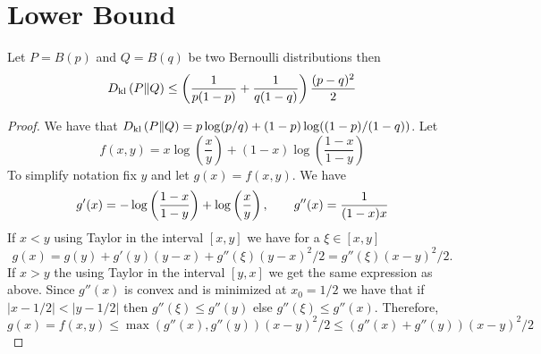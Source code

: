 \section{Lower Bound}
\begin{lemma}\label{l:dkl}
  Let $P=B(p)$ and $Q=B(q)$ be two Bernoulli distributions then
  \[
    D_{\mathrm{kl}} \left(P\|Q\right) \leq
    \left(\frac{1}{p (1-p)} + \frac{1}{q (1-q)} \right) \frac{(p - q)^2}{2}
  \]

\end{lemma}
\begin{proof}
  We have that
  \(
    D_{\mathrm{kl}} \left(P\|Q\right) = p \log (p/q) + (1-p) \log((1-p)/(1-q))
  \).
  Let
  \[
    f(x,y) =
    x \log\left(\frac{x}{y}\right) +
    (1-x) \log\left(\frac{1-x}{1-y}\right)
  \]
  To simplify notation fix $y$ and  let $g(x) = f(x,y)$.  We have
  \begin{align*}
    g'(x) = - \log\left(\frac{1-x}{1-y}\right) + \log\left(\frac{x}{y}\right),
    \qquad g''(x) = \frac{1}{(1-x)x}
  \end{align*}
  If $x < y$ using Taylor in the interval $[x,y]$ we have for a $\xi \in [x,y]$
  \[
    g(x) = g(y) + g'(y)(y-x) + g''(\xi) (y-x)^2/2 = g''(\xi) (x-y)^2/2.
  \]
  If $x> y$ the using Taylor in the interval $[y,x]$ we get the same
  expression as above.
  Since $g''(x)$ is convex and is minimized at $x_0 = 1/2$ we have that
  if $|x-1/2| < |y-1/2|$ then $g''(\xi) \leq g''(y)$
  else $g''(\xi) \leq g''(x)$.  Therefore,
  \[
    g(x) =
    f(x,y) \leq
    \max(g''(x), g''(y))(x-y)^2/2 \leq  (g''(x) + g''(y)) (x-y)^2/2
  \]
\end{proof}


